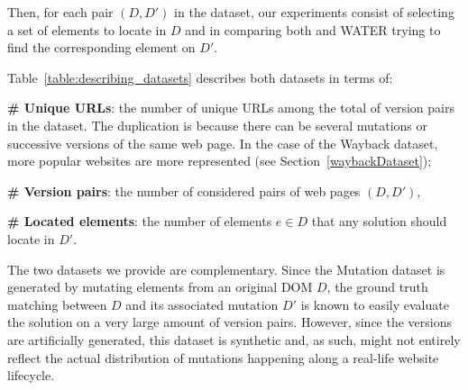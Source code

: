 Then, for each pair $(D, D')$ in the dataset, our experiments consist of selecting a set of elements to locate in $D$ and in comparing both \erratum{} and WATER trying to find the corresponding element on $D'$.

Table~\ref{table:describing_datasets} describes both datasets in terms of:
\begin{compactenum}
    \item \textbf{\# Unique URLs}: the number of unique URLs among the total of version pairs in the dataset. The duplication is because there can be several mutations or successive versions of the same web page. In the case of the {\sc Wayback} dataset, more popular websites are more represented (see Section~\ref{waybackDataset});
    \item \textbf{\# Version pairs}: the number of considered pairs of web pages $(D, D')$,
    \item \textbf{\# Located elements}: the number of elements $e \in D$ that any solution should locate in $D'$.
\end{compactenum}

\begin{table}[!htbp]
    \caption{Description of the \textsc{Mutation} \& \textsc{Wayback} datasets.}
    \label{table:describing_datasets}
    \centering
\end{table}

The two datasets we provide are complementary. 
Since the {\sc Mutation} dataset is generated by mutating elements from an original DOM $D$, the ground truth matching between $D$ and its associated mutation $D'$ is known to easily evaluate the solution on a very large amount of version pairs. 
However, since the versions are artificially generated, this dataset is synthetic and, as such, might not entirely reflect the actual distribution of mutations happening along a real-life website lifecycle.

